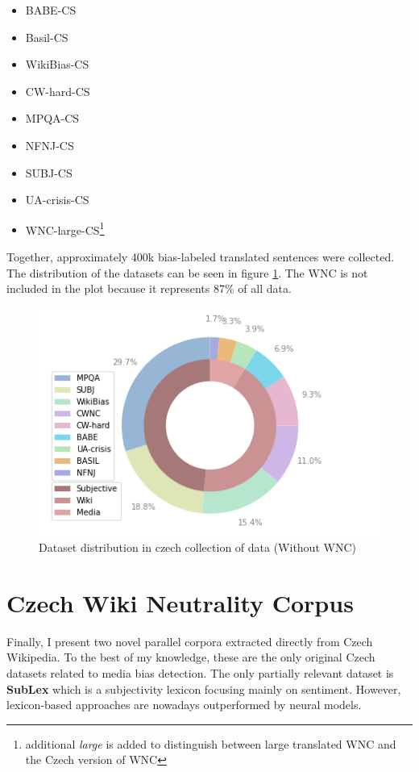 \begin{itemize}
    \item BABE-CS
    \item Basil-CS
    \item WikiBias-CS
    \item CW-hard-CS
    \item MPQA-CS
    \item NFNJ-CS
    \item SUBJ-CS
    \item UA-crisis-CS
    \item WNC-large-CS\footnote{additional \textit{large} is added to distinguish between large translated WNC and the Czech version of WNC}
\end{itemize}

Together, approximately 400k bias-labeled translated sentences were collected. The distribution of the datasets can be seen in figure \ref{fig:cz_data}. The WNC is not included in the plot because it represents 87\% of all data. 


\begin{figure}[h]
  \includegraphics[scale=0.5]{my_modules/multimedia/withoutWNC.png}
  \caption{Dataset distribution in czech collection of data (Without WNC)}
  \label{fig:cz_data}
\end{figure}




\section{Czech Wiki Neutrality Corpus}
Finally, I present two novel parallel corpora extracted directly from Czech Wikipedia. To the best of my knowledge, these are the only original Czech datasets related to media bias detection. The only partially relevant dataset is \textbf{SubLex}\cite{11858/00-097C-0000-0022-FF60-B} which is a subjectivity lexicon focusing mainly on sentiment. However, lexicon-based approaches are nowadays outperformed by neural models.

